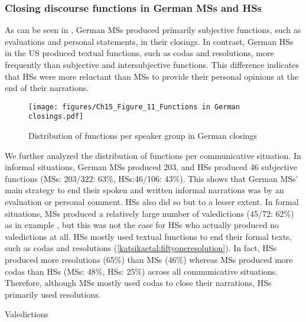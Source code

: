 \documentclass[output=paper,colorlinks,citecolor=brown]{langscibook}
\begin{document}
\subsubsection{Closing discourse functions in German MSs and HSs} \label{sec:katsikaetal:Germanclosings}
As can be seen in , German MSs produced primarily subjective functions, such as evaluations and personal statements, in their closings. In contrast, German HSs in the US produced textual functions, such as codas and resolutions, more frequently than subjective and intersubjective functions. This difference indicates that HSs were more reluctant than MSs to provide their personal opinions at the end of their narrations. 

\begin{figure}
    \centering
    \texttt{[image: figures/Ch15\_Figure\_11\_Functions in German closings.pdf]}
    \caption{Distribution of functions per speaker group in German closings}
    \label{fig:katsikaetal:Germanfunctionsclosings}
\end{figure}

We further analyzed the distribution of functions per communicative situation. In informal situations, German MSs produced 203, and HSs produced 46 subjective functions (MSs: 203/322: 63\%, HSs:46/106: 43\%). This shows that German MSs’ main strategy to end their spoken and written informal narrations was by an evaluation or personal comment. HSs also did so but to a lesser extent.  In formal situations, MSs produced a relatively large number of valedictions (45/72: 62\%) as in example , but this was not the case for HSs who actually produced no valedictions at all. HSs mostly used textual functions to end their formal texts, such as codas and resolutions (\ref{katsikaetal:fiftyoneresolution}). In fact, HSs produced more resolutions (65\%) than MSs (46\%) whereas MSs produced more codas than HSs (MSs: 48\%, HSs: 25\%) across all communicative situations. Therefore, although MSs mostly used codas to close their narrations, HSs primarily used resolutions.

\ea Valedictions \label{katsikaetal:fiftyvaledictions}
    \z
\z
\end{document}
